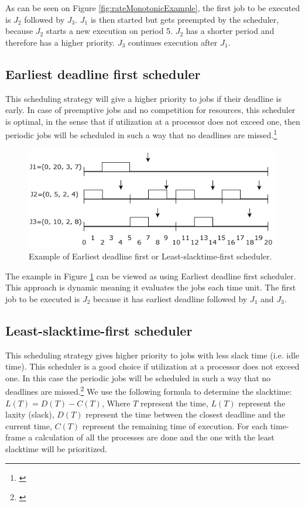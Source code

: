 As can be seen on Figure \ref{fig:rateMonotonicExample}, the first job to be executed is $J_2$ followed by $J_3$. $J_1$ is then started but gets preempted by the scheduler, because $J_2$ starts a new execution on period 5. $J_2$ has a shorter period and therefore has a higher priority. $J_3$ continues execution after $J_1$.

\subsection{Earliest deadline first scheduler}
This scheduling strategy will give a higher priority to jobs if their deadline is
early. In case of preemptive jobs and no competition for resources, this scheduler
is optimal, in the sense that if utilization at a processor does not exceed one, then
periodic jobs will be scheduled in such a way that no deadlines are missed.\footnote{\cite[p.~184]{Fokkink1965}}

\begin{figure}[!h]
	\centering
	\includegraphics[scale=0.5]{realTimeComputing/fig/EarliestDeadlineFirst.png}
	\caption{Example of Earliest deadline first or Least-slacktime-first scheduler.}
	\label{fig:EarliestDeadlineFirstAndLeastSlacktimeFirstSchedulerExample}
\end{figure}

The example in Figure \ref{fig:EarliestDeadlineFirstAndLeastSlacktimeFirstSchedulerExample} can be viewed as using Earliest deadline first scheduler. This approach is dynamic meaning it evaluates the jobs each time unit. The first job to be executed is $J_2$ because it has earliest deadline followed by $J_1$ and $J_3$.

\subsection{Least-slacktime-first scheduler}
This scheduling strategy gives higher priority to jobs with less slack time (i.e. idle time). This scheduler is a good choice if utilization at a processor does not exceed one. In this case the periodic jobs will be scheduled in such a way that no deadlines are missed.\footnote{\cite[p.~184]{Fokkink1965}} We use the following formula to determine the slacktime: $L(T)=D(T)-C(T)$, Where $T$ represent the time, $L(T)$ represent the laxity (slack), $D(T)$ represent the time between the closest deadline and the current time, $C(T)$ represent the remaining time of execution. For each time-frame a calculation of all the processes are done and the one with the least slacktime will be prioritized.

